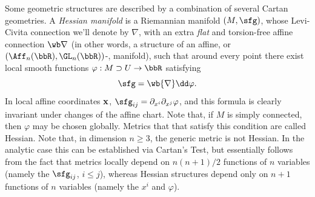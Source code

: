 \begin{example}
    Some geometric structures are described by a combination of several Cartan geometries. A \emph{Hessian manifold} is a Riemannian manifold $(M,\sfg)$, whose Levi-Civita connection we'll denote by $\nabla$, with an extra \emph{flat} and torsion-free affine connection $\wb\nabla$ (in other words, a structure of an affine, or $(\Aff_n(\bbR),\GL_n(\bbR))$-, manifold), such that around every point there exist local smooth functions $\varphi:M\supset U\to \bbR$ satisfying
    \[\sfg=\wb{\nabla}\dd\varphi.\]
    In local affine coordinates $\bf{x}$, $\sfg_{ij}=\partial_{x^i}\partial_{x^j}\varphi$, and this formula is clearly invariant under changes of the affine chart. Note that, if $M$ is simply connected, then $\varphi$ may be chosen globally. Metrics that that satisfy this condition are called Hessian. Note that, in dimension $n\geq 3$, the generic metric is not Hessian. In the analytic case this can be established via Cartan's Test, but essentially follows from the fact that metrics locally depend on $n(n+1)/2$ functions of $n$ variables (namely the $\sfg_{ij}$, $i\leq j$), whereas Hessian structures depend only on $n+1$ functions of $n$ variables (namely the $x^i$ and $\varphi$).


\end{example}
